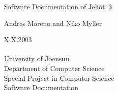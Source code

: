 \documentclass[a4paper, 12pt]{article}
\begin{document}
\vspace*{4cm}


\vspace{2cm}

{\LARGE Software Documentation of Jeliot~3}


\vspace{2cm}

{\large Andres Moreno and Niko Myller}


{\large
X.X.2003 \\ \\
University of Joensuu \\
Department of Computer Science\\
Special Project in Computer Science\\
Software Documentation
}

\vspace{1cm}

\thispagestyle{empty} %

\newpage %


\setlength{\parskip}{0ex}

\tableofcontents
\newpage

\setlength{\parskip}{2ex}


\setcounter{page}{1}


\newpage


\newpage


\newpage


\newpage


\newpage


\newpage



\end{document}
